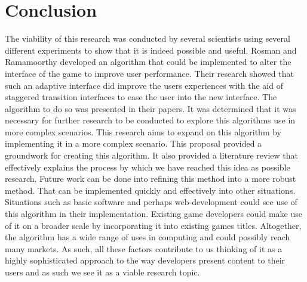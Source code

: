 \documentclass[11pt]{article}
\begin{document}
\section{Conclusion}
The viability of this research was conducted by several scientists using several different experiments to show that it is indeed possible and useful. Rosman and Ramamoorthy \citep{rosman2014user} developed an algorithm that could be implemented to alter the interface of the game to improve user performance. Their research showed that such an adaptive interface did improve the users experiences with the aid of staggered transition interfaces to ease the user into the new interface. The algorithm to do so was presented in their papers. It was determined that it was necessary for further research to be conducted to explore this algorithms use in more complex scenarios. This research aims to expand on this algorithm by implementing it in a more complex scenario.
This proposal provided a groundwork for creating this algorithm. It also provided a literature review that effectively explains the process by which we have reached this idea as possible research. 
\vspace{6.0 mm}
Future work can be done into refining this method into a more robust method. That can be implemented quickly and effectively into other situations. Situations such as basic software and perhaps web-development could see use of this algorithm in their implementation. Existing game developers could make use of it on a broader scale by incorporating it into existing games titles. Altogether, the algorithm has a wide range of uses in computing and could possibly reach many markets. As such, all these factors contribute to us thinking of it as a highly sophisticated approach to the way developers present content to their users and as such we see it as a viable research topic.

\clearpage

\end{document}
